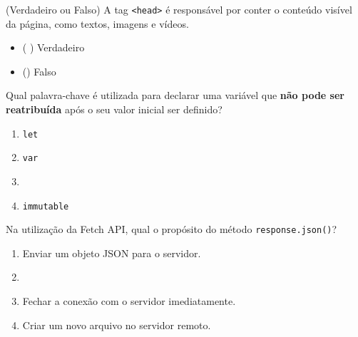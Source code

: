 \documentclass[12pt,a4paper]{article}
\newcommand{\correto}[1]{\iftoggle{gabarito}{\textbf{\color{corGabarito}#1}}{#1}}
\newcommand{\marcar}[1]{\iftoggle{gabarito}{\textbf{\color{corGabarito}#1}}{}}
\newcommand{\checkGabarito}[1]{\iftoggle{gabarito}{\hspace{0.5cm} \textbf{\color{corGabarito}--- #1}}{}}
\begin{document}
\begin{tcolorbox}[colback=white, colframe=azulTitulo, title=Questão 13: Estrutura de Documentos Web]
    (Verdadeiro ou Falso) A tag \texttt{<head>} é responsável por conter o conteúdo visível da página, como textos, imagens e vídeos.
    \begin{itemize}
        \item ( ) Verdadeiro
        \item (\marcar{X}) Falso \checkGabarito{(O conteúdo visível fica no body)}
    \end{itemize}
\end{tcolorbox}

\begin{tcolorbox}[colback=white, colframe=azulTitulo, title=Questão 14: JavaScript Moderno]
    Qual palavra-chave é utilizada para declarar uma variável que \textbf{não pode ser reatribuída} após o seu valor inicial ser definido?
    \begin{enumerate}[label=\alph*)]
        \item \texttt{let}
        \item \texttt{var}
        \item \correto{const}
        \item \texttt{immutable}
    \end{enumerate}
\end{tcolorbox}

\begin{tcolorbox}[colback=white, colframe=azulTitulo, title=Questão 15: Integração com APIs]
    Na utilização da Fetch API, qual o propósito do método \texttt{response.json()}?
    \begin{enumerate}[label=\alph*)]
        \item Enviar um objeto JSON para o servidor.
        \item \correto{Converter o fluxo de resposta da rede em um objeto JavaScript utilizável.}
        \item Fechar a conexão com o servidor imediatamente.
        \item Criar um novo arquivo no servidor remoto.
    \end{enumerate}
\end{tcolorbox}
\end{document}
